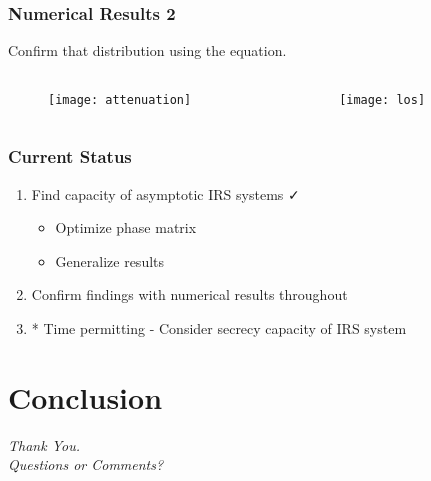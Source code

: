 \documentclass[10pt,tgadventor, onlymath]{beamer}
\begin{document}
\begin{frame}
	\frametitle{Numerical Results 2}
	Confirm that distribution using the equation.
\begin{columns}
\begin{column}{0.5\linewidth}
\centering
\begin{figure}
\texttt{[image: attenuation]}
\end{figure}
\end{column}
\begin{column}{0.5\linewidth}
\centering
\begin{figure}
\texttt{[image: los]}
\end{figure}
\end{column}
\end{columns}
\end{frame}



\begin{frame}
\frametitle{Current Status}
\begin{enumerate}
\item
	Find capacity of asymptotic IRS systems  \faCheck
	\begin{itemize}
	\item 
		Optimize phase matrix	\faQuestion
	\item
		Generalize results
	\end{itemize}

\item 
	Confirm findings with numerical results throughout
	
\item
	* Time permitting - Consider secrecy capacity of IRS system
\end{enumerate}
\end{frame}


\section{Conclusion}

\begin{frame}
  \centering \Large
  \emph{Thank You.}
  \\
	\bigskip
    \centering \Large
  \emph{Questions or Comments?}

\end{frame}
\end{document}
